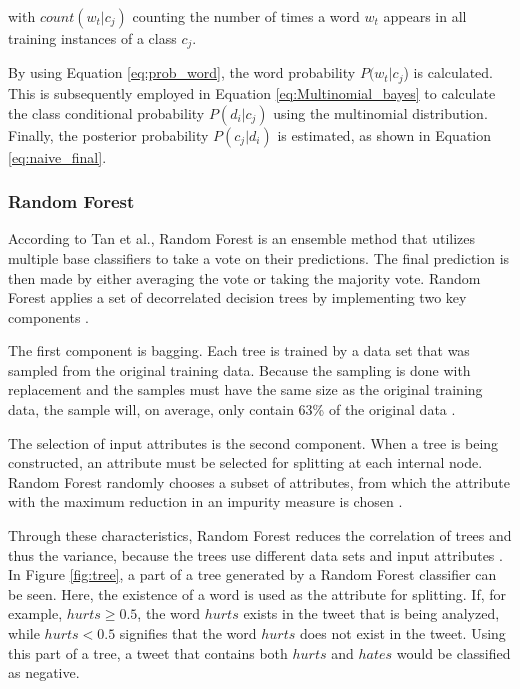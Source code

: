         with $count(w_t|c_j)$ counting the number of times a word $w_t$ appears in all training instances of a class $c_j$.
        
        By using Equation \eqref{eq:prob_word}, the word probability $P(w_t|c_j$) is calculated. This is subsequently employed in Equation \eqref{eq:Multinomial_bayes} to calculate the class conditional probability $P(d_i|c_j)$ using the multinomial distribution. Finally, the posterior probability $P(c_j|d_i)$ is estimated, as shown in Equation \eqref{eq:naive_final}.
        
\subsubsection{Random Forest}
        According to Tan et al., Random Forest is an ensemble method that utilizes multiple base classifiers to take a vote on their predictions. The final prediction is then made by either averaging the vote or taking the majority vote. Random Forest applies a set of decorrelated decision trees by implementing two key components \cite{DBLP:books/aw/TanSKK2019}.
        
        The first component is bagging. Each tree is trained by a data set that was sampled from the original training data. Because the sampling is done with replacement and the samples must have the same size as the original training data, the sample will, on average, only contain 63\% of the original data \cite{DBLP:books/aw/TanSKK2019}.
        
        The selection of input attributes is the second component. When a tree is being constructed, an attribute must be selected for splitting at each internal node. Random Forest randomly chooses a subset of attributes, from which the attribute with the maximum reduction in an impurity measure is chosen \cite{DBLP:books/aw/TanSKK2019}.
        
        Through these characteristics, Random Forest reduces the correlation of trees and thus the variance, because the trees use different data sets and input attributes \cite{DBLP:books/aw/TanSKK2019}. In Figure \ref{fig:tree}, a part of a tree generated by a Random Forest classifier can be seen. Here, the existence of a word is used as the attribute for splitting. If, for example, $hurts \geq 0.5$, the word $hurts$ exists in the tweet that is being analyzed, while $hurts < 0.5$ signifies that the word $hurts$ does not exist in the tweet. Using this part of a tree, a tweet that contains both $hurts$ and $hates$ would be classified as negative.
        

